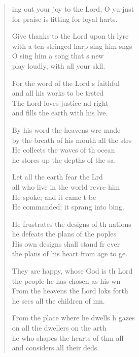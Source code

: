 \begin{verse}
  \begin{patverse}
    ing out your joy to the Lord, O yu just\Med\\
    for praise is fitting for loyal harts.

Give thanks to the Lord upon th lyre\Med\\
    with a ten-stringed harp sing him sngs\\
O sing him a song that \pointup{\i}s new\Med\\
    play loudly, with all your sk\pointup{\i}ll.

For the word of the Lord \pointup{\i}s faithful\Med\\
    and all his works to be trsted\\
The Lord loves justice nd right\Med\\
    and fills the earth with his lve.

By his word the heavens wre made\Med\\
    by the breath of his mouth all the strs\\
He collects the waves of th ocean\Med\\
    he stores up the depths of the sa.

Let all the earth fear the Lrd\Med\\
    all who live in the world revre him\\
He spoke; and it came t be\Med\\
    He commanded; it sprang into bing.

He frustrates the designs of th nations\Med\\
    he defeats the plans of the poples\\
His own designs shall stand fr ever\Med\\
    the plans of his heart from age to ge.

They are happy, whose God is th Lord\Med\\
    the people he has chosen as his wn\\
From the heavens the Lord loks forth\Med\\
    he sees all the children of mn.

From the place where he dwells h gazes\Med\\
    on all the dwellers on the arth\\
he who shapes the hearts of thm all\Med\\
    and considers all their deds.


\end{patverse}
\end{verse}
